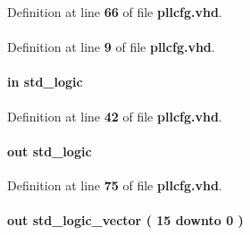 Definition at line {\bf 66} of file {\bf pllcfg.\+vhd}.

\paragraph[{ieee}]{\hspace{0.3cm}{\ttfamily [Library]}}\label{classpllcfg_a0a6af6eef40212dbaf130d57ce711256}


Definition at line {\bf 9} of file {\bf pllcfg.\+vhd}.

\paragraph[{lreset}]{ {\bfseries \textcolor{keywordflow}{in}\textcolor{vhdlchar}{ }} {\bfseries \textcolor{comment}{std\+\_\+logic}\textcolor{vhdlchar}{ }} \hspace{0.3cm}{\ttfamily [Port]}}\label{classpllcfg_ab4573fdea1cdc3308c947af523ca0d97}


Definition at line {\bf 42} of file {\bf pllcfg.\+vhd}.

\paragraph[{m\+\_\+byp}]{ {\bfseries \textcolor{keywordflow}{out}\textcolor{vhdlchar}{ }} {\bfseries \textcolor{comment}{std\+\_\+logic}\textcolor{vhdlchar}{ }} \hspace{0.3cm}{\ttfamily [Port]}}\label{classpllcfg_acb48432d4f0d7e602787cb212e419137}


Definition at line {\bf 75} of file {\bf pllcfg.\+vhd}.

\paragraph[{m\+\_\+cnt}]{ {\bfseries \textcolor{keywordflow}{out}\textcolor{vhdlchar}{ }} {\bfseries \textcolor{comment}{std\+\_\+logic\+\_\+vector}\textcolor{vhdlchar}{ }\textcolor{vhdlchar}{(}\textcolor{vhdlchar}{ }\textcolor{vhdlchar}{ } \textcolor{vhdldigit}{15} \textcolor{vhdlchar}{ }\textcolor{keywordflow}{downto}\textcolor{vhdlchar}{ }\textcolor{vhdlchar}{ } \textcolor{vhdldigit}{0} \textcolor{vhdlchar}{ }\textcolor{vhdlchar}{)}\textcolor{vhdlchar}{ }} \hspace{0.3cm}{\ttfamily [Port]}}\label{classpllcfg_ab8debabf62a249d7a9e62f5981ff3202}


